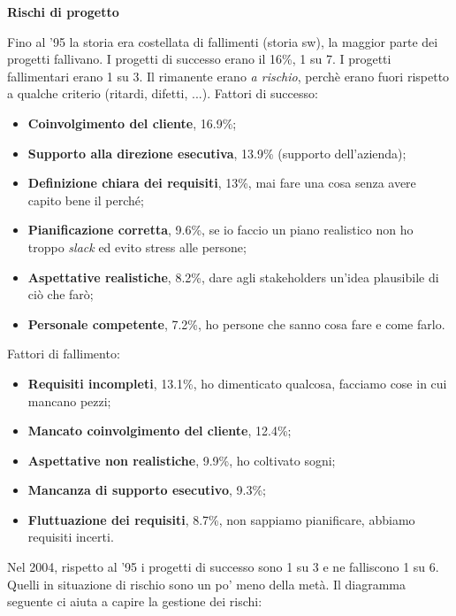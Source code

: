 \textbf{Rischi di progetto}\

Fino al '95 la storia era costellata di fallimenti (storia sw), la maggior parte dei progetti fallivano. I progetti di successo erano il 16\%, 1 su 7. I progetti fallimentari erano 1 su 3. Il rimanente erano \textit{a rischio}, perchè erano fuori rispetto a qualche criterio (ritardi, difetti, ...). Fattori di successo:

\begin{itemize}

	\item \textbf{Coinvolgimento del cliente}, 16.9\%;
	\item \textbf{Supporto alla direzione esecutiva}, 13.9\% (supporto dell'azienda);
	\item \textbf{Definizione chiara dei requisiti}, 13\%, mai fare una cosa senza avere capito bene il perché;
	\item \textbf{Pianificazione corretta}, 9.6\%, se io faccio un piano realistico non ho troppo \textit{slack} ed evito stress alle persone;
	\item \textbf{Aspettative realistiche}, 8.2\%, dare agli stakeholders un'idea plausibile di ciò che farò;
	\item \textbf{Personale competente}, 7.2\%, ho persone che sanno cosa fare e come farlo.

\end{itemize}

Fattori di fallimento:

\begin{itemize}

	\item \textbf{Requisiti incompleti}, 13.1\%, ho dimenticato qualcosa, facciamo cose in cui mancano pezzi;
	\item \textbf{Mancato coinvolgimento del cliente}, 12.4\%;
	\item \textbf{Aspettative non realistiche}, 9.9\%, ho coltivato sogni;
	\item \textbf{Mancanza di supporto esecutivo}, 9.3\%;
	\item \textbf{Fluttuazione dei requisiti}, 8.7\%, non sappiamo pianificare, abbiamo requisiti incerti.

\end{itemize}

Nel 2004, rispetto al '95 i progetti di successo sono 1 su 3 e ne falliscono 1 su 6. Quelli in situazione di rischio sono un po' meno della metà. Il diagramma seguente ci aiuta a capire la gestione dei rischi:

